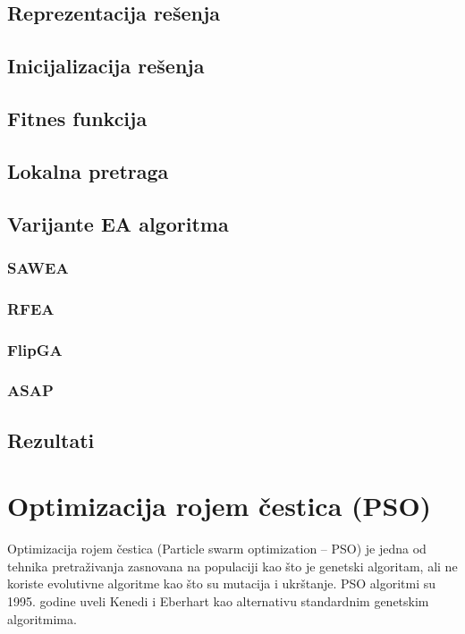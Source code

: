\documentclass{article}
\begin{document}
\subsection{Reprezentacija rešenja}

\subsection{Inicijalizacija rešenja}

\subsection{Fitnes funkcija}

\subsection{Lokalna pretraga}

\subsection{Varijante EA algoritma}

\subsubsection{SAWEA}

\subsubsection{RFEA}

\subsubsection{FlipGA}

\subsubsection{ASAP}


\subsection{Rezultati}




\section{Optimizacija rojem čestica (PSO)}
Optimizacija rojem čestica (Particle swarm optimization – PSO) je jedna od tehnika pretraživanja zasnovana na populaciji kao što je genetski algoritam, ali ne koriste evolutivne algoritme kao što su mutacija i ukrštanje.
PSO algoritmi su 1995. godine uveli Kenedi i Eberhart kao alternativu standardnim genetskim algoritmima. \\
\end{document}
